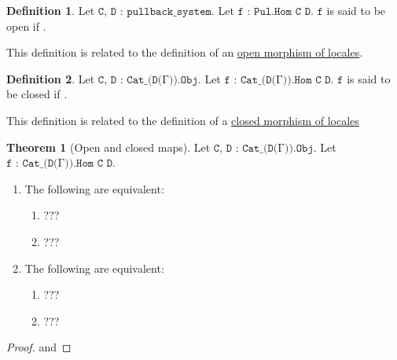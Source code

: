 \documentclass{book}
\theoremstyle{definition}
\newtheorem{definition}{Definition}
\newtheorem{theorem}{Theorem}
\begin{document}
\begin{definition}
Let $\texttt{C, D : pullback\_system}$. Let $\texttt{f : Pul.Hom C D}$. $\texttt{f}$ is said to be open if . 
\end{definition}



This definition is related to the definition of an \href{https://ncatlab.org/nlab/show/open+morphism}{open morphism of locales}.

\begin{definition}
Let $\texttt{C, D : Cat\_(D(Γ)).Obj}$. Let $\texttt{f : Cat\_(D(Γ)).Hom C D}$. $\texttt{f}$ is said to be closed if .
\end{definition}

This definition is related to the definition of a \href{https://ncatlab.org/nlab/show/closed+morphism}{closed morphism of locales}

\begin{theorem}[Open and closed maps]
Let $\texttt{C, D : Cat\_(D(Γ)).Obj}$. Let $\texttt{f : Cat\_(D(Γ)).Hom C D}$.
\begin{enumerate}
\item The following are equivalent: 
\begin{enumerate}
\item ??? 
\item ???
\end{enumerate}
\item The following are equivalent:
\begin{enumerate}
\item ??? 
\item ???
\end{enumerate}
\end{enumerate}
\end{theorem}

\begin{proof}

and

\end{proof}
\end{document}
